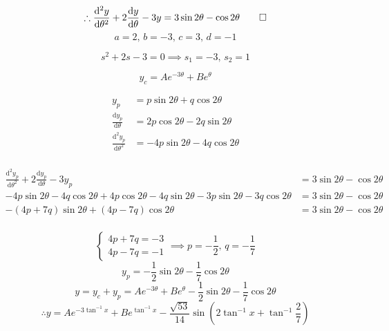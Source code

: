 \documentclass[a4paper]{article}
\newcommand{\dd}{\mathrm d}
\begin{document}
\[\therefore\frac{\dd^2y}{\dd\theta^2}+2\frac{\dd y}{\dd\theta}-3y
=3\sin2\theta-\cos2\theta\qed\]
\[\boxed{a=2,\,b=-3,\,c=3,\,d=-1}\]

\newpage
\[s^2+2s-3=0\implies s_1=-3,\,s_2=1\]

\[y_c=Ae^{-3\theta}+Be^\theta\]

\[\begin{aligned}
	y_p&=p\sin2\theta+q\cos2\theta\\
	\frac{\dd y_p}{\dd\theta}&=2p\cos2\theta-2q\sin2\theta\\
	\frac{\dd^2y_p}{\dd\theta^2}&=-4p\sin2\theta-4q\cos2\theta\\
\end{aligned}\]

\[\begin{aligned}
	\frac{\dd^2y_p}{\dd\theta^2}+2\frac{\dd y_p}{\dd\theta}-3y_p
	&=3\sin2\theta-\cos2\theta\\
	-4p\sin2\theta-4q\cos2\theta
	+4p\cos2\theta-4q\sin2\theta
	-3p\sin2\theta-3q\cos2\theta
	&=3\sin2\theta-\cos2\theta\\
	-(4p+7q)\sin2\theta+(4p-7q)\cos2\theta
	&=3\sin2\theta-\cos2\theta\\
\end{aligned}\]

\[\begin{cases}
	4p+7q=-3\\
	4p-7q=-1
\end{cases}
\implies p=-\frac12,\,q=-\frac17\]
\[y_p=-\frac12\sin2\theta-\frac17\cos2\theta\]
\[y=y_c+y_p=Ae^{-3\theta}+Be^\theta-\frac12\sin2\theta-\frac17\cos2\theta\]
\[\therefore\boxed{y=
Ae^{-3\tan^{-1}x}+Be^{\tan^{-1}x}
-\frac{\sqrt{53}}{14}\sin\left(2\tan^{-1}x+\tan^{-1}\frac27\right)
}\]
\end{document}
